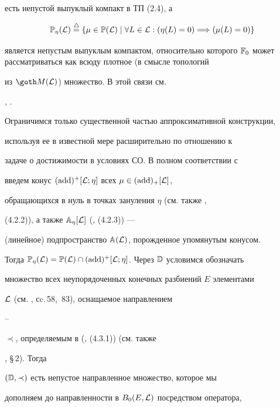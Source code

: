 %


есть непустой выпуклый компакт в ТП (2.4), а


%


\begin{equation}


{\Bbb P}_\eta({\cal L}) \stac \{\mu \in {\Bbb P}({\cal L}) \mid


\forall L \in {\cal L}: (\eta(L) = 0) \Lo (\mu(L) = 0)\}


\end{equation}


%


является непустым выпуклым компактом, относительно которого ${\Bbb


F}_0$ может рассматриваться как всюду плотное (в смысле топологий


из ${\goth M}({\cal L})$) множество. В этой связи см.


\cite{Ch2}, \cite{Ch3}. 


Ограничимся только существенной частью аппроксимативной конструкции,


используя ее в известной мере расширительно по отношению к


задаче о достижимости в условиях СО. В полном соответствии с \cite{Ch4}


введем конус $(\operatorname{add})^+[{\cal L}; \eta]$ всех $\mu \in (\operatorname{add})_+[{\cal L}]$,


обращающихся в нуль в точках зануления $\eta$ (см. также \cite{Ch1},


(4.2.2)), а также ${\Bbb A}_\eta[{\cal L}]$ (\cite{Ch1}, (4.2.3)) ---


(линейное) подпространство ${\Bbb A}({\cal L})$, порожденное упомянутым конусом.


Тогда ${\Bbb P}_\eta({\cal L}) = {\Bbb P}({\cal L}) \cap


(\add)^+[{\cal L}; \eta]$. Через ${\Bbb D}$ условимся обозначать


множество всех неупорядоченных конечных разбиений $E$ элементами


${\cal L}$ (см. \cite{Ch1}, сc.\,58,~83), оснащаемое направлением


\cite{Kel}--\cite{Ale}


$\prec$, определяемым в (\cite{Ch1}, (4.3.1)) (см. также


\cite{Ch4}, \S\,2). Тогда


$({\Bbb D}, \prec)$ есть непустое направленное множество, которое мы


дополняем до направленности в $B_0(E, {\cal L})$ посредством оператора,


